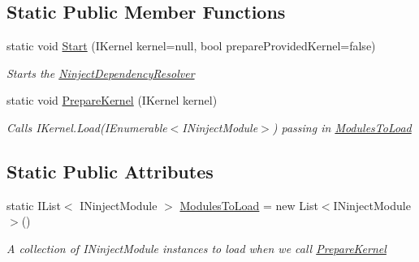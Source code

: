 \subsection*{Static Public Member Functions}
\begin{DoxyCompactItemize}
\item 
static void \hyperlink{classCqrs_1_1Ninject_1_1Configuration_1_1NinjectDependencyResolver_adc6171ed45679dcbaa67782770ba5083_adc6171ed45679dcbaa67782770ba5083}{Start} (I\+Kernel kernel=null, bool prepare\+Provided\+Kernel=false)
\begin{DoxyCompactList}\small\item\em Starts the \hyperlink{classCqrs_1_1Ninject_1_1Configuration_1_1NinjectDependencyResolver}{Ninject\+Dependency\+Resolver} \end{DoxyCompactList}\item 
static void \hyperlink{classCqrs_1_1Ninject_1_1Configuration_1_1NinjectDependencyResolver_a00f928f47792a9945513b239a5b82293_a00f928f47792a9945513b239a5b82293}{Prepare\+Kernel} (I\+Kernel kernel)
\begin{DoxyCompactList}\small\item\em Calls I\+Kernel.\+Load(\+I\+Enumerable$<$\+I\+Ninject\+Module$>$) passing in \hyperlink{classCqrs_1_1Ninject_1_1Configuration_1_1NinjectDependencyResolver_a45264a8fae5380727d1af41bc2155381_a45264a8fae5380727d1af41bc2155381}{Modules\+To\+Load} \end{DoxyCompactList}\end{DoxyCompactItemize}
\subsection*{Static Public Attributes}
\begin{DoxyCompactItemize}
\item 
static I\+List$<$ I\+Ninject\+Module $>$ \hyperlink{classCqrs_1_1Ninject_1_1Configuration_1_1NinjectDependencyResolver_a45264a8fae5380727d1af41bc2155381_a45264a8fae5380727d1af41bc2155381}{Modules\+To\+Load} = new List$<$I\+Ninject\+Module$>$()
\begin{DoxyCompactList}\small\item\em A collection of I\+Ninject\+Module instances to load when we call \hyperlink{classCqrs_1_1Ninject_1_1Configuration_1_1NinjectDependencyResolver_a00f928f47792a9945513b239a5b82293_a00f928f47792a9945513b239a5b82293}{Prepare\+Kernel} \end{DoxyCompactList}\end{DoxyCompactItemize}
